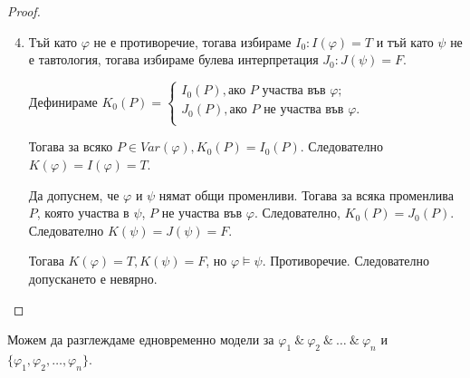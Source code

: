 \documentclass{article}
\begin{document}
\begin{prop}
\begin{proof}
\begin{enumerate}
\setcounter{enumi}{3}
\item Тъй като $\varphi$ не е противоречие, тогава избираме $I_0: I(\varphi) = T$ и тъй като $\psi$ не е тавтология, тогава избираме булева интерпретация $J_0: J(\psi) = F$.

Дефинираме $K_0(P) = \left\{
                \begin{array}{ll}
                  I_0(P), \text{ако } P \text{ участва във } \varphi;\\
                  J_0(P), \text{ако } P \text{ не участва във } \varphi.\\
                \end{array}
              \right.$
              
Тогава за всяко $P \in Var(\varphi), K_0(P) = I_0(P)$. Следователно $K(\varphi) = I(\varphi) = T$.

Да допуснем, че $\varphi$ и $\psi$ нямат общи променливи. Тогава за всяка променлива $P$, която участва в $\psi$, $P$ не участва във $\varphi$. Следователно, $K_0(P) = J_0(P)$. Следователно $K(\psi) = J(\psi) = F$.

Тогава $K(\varphi) = T, K(\psi) = F$, но $\varphi \models \psi$. Противоречие. Следователно допускането е невярно.

\end{enumerate}
\end{proof}
\fi
\begin{remark}
Можем да разглеждаме едновременно модели за $\varphi_1\ \&\ \varphi_2\ \&\ \ldots\ \&\ \varphi_n$ и $\{\varphi_1, \varphi_2, \ldots, \varphi_n\}$.
\end{remark}
\end{prop}
\end{document}
